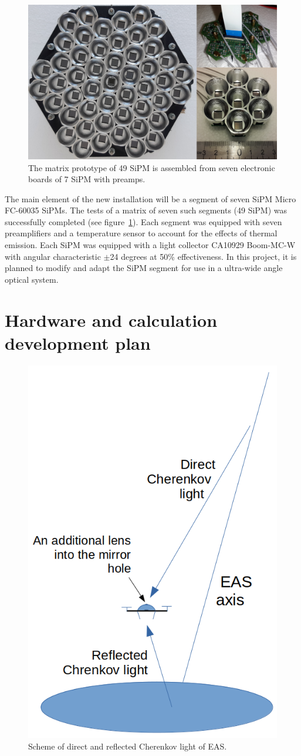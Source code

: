 \documentclass[a4paper,11pt]{article}
\begin{document}
\begin{figure}[htbp]
\centering %
\includegraphics[width=.55\textwidth,trim=0 0 0 0,clip]{mosaic_protype.png}
\caption{\label{fig:mosaic49_7} The matrix prototype of 49 SiPM is assembled from seven electronic boards of 7 SiPM with preamps.}
\end{figure}


The main element of the new installation will be a segment of seven SiPM Micro FC-60035 SiPMs. The tests of a matrix of seven such segments (49 SiPM) was successfully completed (see figure~\ref{fig:mosaic49_7}). Each segment was equipped with seven preamplifiers and a temperature sensor to account for the effects of thermal emission. Each SiPM was equipped with a light collector CA10929 Boom-MC-W with angular characteristic $\pm$24 degrees at 50\% effectiveness. In this project, it is planned to modify and adapt the SiPM segment for use in a ultra-wide angle optical system.



\section{Hardware and calculation development plan}

\begin{figure}[htbp]
\centering %
\includegraphics[width=.35\textwidth,trim=0 0 0 0,clip]{DirectCL.png}
\caption{\label{fig:DirectCL} Scheme of direct and reflected Cherenkov light of EAS.}
\end{figure}
\end{document}
